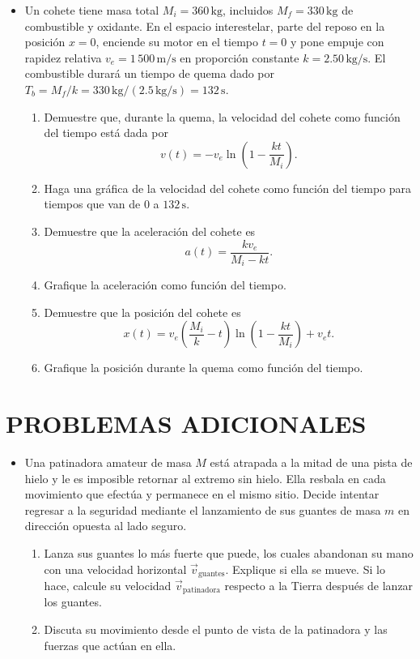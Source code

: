 \documentclass[11pt,a4paper]{article}
\begin{document}
\newpage

\begin{itemize}
    \item[\textbf{34.}] Un cohete tiene masa total \(M_i = 360\,\text{kg}\), incluidos \(M_f = 330\,\text{kg}\) de combustible y oxidante. En el espacio interestelar, parte del reposo en la posición \(x = 0\), enciende su motor en el tiempo \(t = 0\) y pone empuje con rapidez relativa \(v_e = 1\,500\,\text{m/s}\) en proporción constante \(k = 2.50\,\text{kg/s}\). El combustible durará un tiempo de quema dado por \(T_b = M_f/k = 330\,\text{kg}/(2.5\,\text{kg/s}) = 132\,\text{s}\).
    \begin{enumerate}
        \item Demuestre que, durante la quema, la velocidad del cohete como función del tiempo está dada por
        \[
        v(t) = -v_e \ln\left(1 - \frac{kt}{M_i}\right).
        \]
        \item Haga una gráfica de la velocidad del cohete como función del tiempo para tiempos que van de \(0\) a \(132\,\text{s}\).
        \item Demuestre que la aceleración del cohete es
        \[
        a(t) = \frac{k v_e}{M_i - kt}.
        \]
        \item Grafique la aceleración como función del tiempo.
        \item Demuestre que la posición del cohete es
        \[
        x(t) = v_e \left(\frac{M_i}{k} - t\right) \ln\left(1 - \frac{kt}{M_i}\right) + v_e t.
        \]
        \item Grafique la posición durante la quema como función del tiempo.
    \end{enumerate}
    \vspace*{8cm}
\end{itemize}

\section*{PROBLEMAS ADICIONALES}

\begin{itemize}
    \item[\textbf{35.}] Una patinadora amateur de masa \(M\) está atrapada a la mitad de una pista de hielo y le es imposible retornar al extremo sin hielo. Ella resbala en cada movimiento que efectúa y permanece en el mismo sitio. Decide intentar regresar a la seguridad mediante el lanzamiento de sus guantes de masa \(m\) en dirección opuesta al lado seguro.
    \begin{enumerate}
        \item Lanza sus guantes lo más fuerte que puede, los cuales abandonan su mano con una velocidad horizontal \(\vec{v}_{\text{guantes}}\). Explique si ella se mueve. Si lo hace, calcule su velocidad \(\vec{v}_{\text{patinadora}}\) respecto a la Tierra después de lanzar los guantes.
        \item Discuta su movimiento desde el punto de vista de la patinadora y las fuerzas que actúan en ella.
    \end{enumerate}
    \vspace*{6cm}
\end{itemize}
\end{document}
